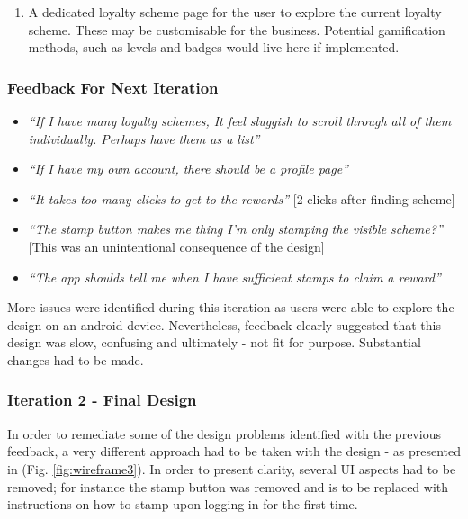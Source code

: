 \begin{enumerate}
  \item A dedicated loyalty scheme page for the user to explore the current loyalty scheme. These may be customisable for the business. Potential gamification methods, such as levels and badges would live here if implemented.
\end{enumerate}

\subsubsection{Feedback For Next Iteration}
\begin{itemize}
  \item \textit{``If I have many loyalty schemes, It feel sluggish to scroll through all of them individually. Perhaps have them as a list''}
  \item \textit{``If I have my own account, there should be a profile page''}
  \item \textit{``It takes too many clicks to get to the rewards''} [2 clicks after finding scheme]
    \item \textit{``The stamp button makes me thing I'm only stamping the visible scheme?''} [This was an unintentional consequence of the design]
     \item \textit{``The app shoulds tell me when I have sufficient stamps to claim a reward''}
\end{itemize}

 More issues were identified during this iteration as users were able to explore the design on an android device. Nevertheless, feedback clearly suggested that this design was slow, confusing and ultimately - not fit for purpose. Substantial changes had to be made.

\subsubsection{Iteration 2 - Final Design}
In order to remediate some of the design problems identified with the previous feedback, a very different approach had to be taken with the design - as presented in (Fig. \ref{fig:wireframe3}). In order to present clarity, several UI aspects had to be removed; for instance the stamp button was removed and is to be replaced with instructions on how to stamp upon logging-in for the first time.


